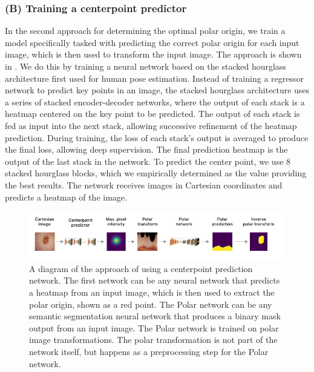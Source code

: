     \subsubsection{(B) Training a centerpoint predictor}
    \label{centerpoint-approach}
    
In the second approach for determining the optimal polar origin, we train a model specifically tasked with predicting the correct
polar origin for each input 
image, which is then used to transform the input image. The approach is shown in . 
We do this by training a neural network based on the stacked hourglass architecture 
\cite{newellStackedHourglassNetworks2016} first used for human pose estimation. Instead of training a regressor network to
predict key points in an image, the stacked hourglass architecture uses a series of stacked encoder-decoder networks, where the output
of each stack is a heatmap centered on the key point to be predicted. The output of each stack is fed as input into the next stack, allowing 
successive refinement of the heatmap prediction. During training, the loss of each stack's output is averaged to produce the final loss, 
allowing deep supervision. The final prediction heatmap is the output of the last stack in the network. To predict the center point, 
we use 8 stacked hourglass blocks, which we empirically determined as the value providing the best results. The network receives images in Cartesian 
coordinates and predicts a heatmap of the image.

	\begin{figure}[h]
		\centering
		\includegraphics[width=\linewidth]{images/4/centerpoint-approach}
		\caption{A diagram of the approach of using a centerpoint prediction network. The first network can be any neural network that predicts a heatmap from an input image, which is then used to extract the polar origin, shown as a red point. The Polar network can be any semantic segmentation neural network that produces a binary mask output from an input image. The Polar network is trained on polar image transformations. The polar transformation is not part of the network itself, but happens as a preprocessing step for the Polar network. \cite{bencevicTrainingPolarImage2021}}
		\label{fig:centerpoint-approach}
	\end{figure}
 
